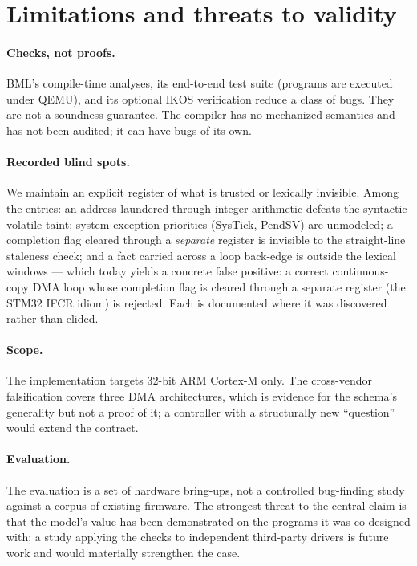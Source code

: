 \documentclass[10pt,twocolumn]{article}
\begin{document}
\section{Limitations and threats to validity}
\label{sec:limits}

\paragraph{Checks, not proofs.} BML's compile-time analyses, its end-to-end test
suite (programs are executed under QEMU), and its optional IKOS verification
reduce a class of bugs. They are not a soundness guarantee. The compiler has no
mechanized semantics and has not been audited; it can have bugs of its own.

\paragraph{Recorded blind spots.} We maintain an explicit register of what is
trusted or lexically invisible. Among the entries: an address laundered through
integer arithmetic defeats the syntactic volatile taint; system-exception
priorities (SysTick, PendSV) are unmodeled; a completion flag cleared through a
\emph{separate} register is invisible to the straight-line staleness check; and a
fact carried across a loop back-edge is outside the lexical windows --- which
today yields a concrete false positive: a correct continuous-copy DMA loop whose
completion flag is cleared through a separate register (the STM32 IFCR idiom) is
rejected. Each is documented where it was discovered rather than elided.

\paragraph{Scope.} The implementation targets 32-bit ARM Cortex-M only. The
cross-vendor falsification covers three DMA architectures, which is evidence for
the schema's generality but not a proof of it; a controller with a structurally
new ``question'' would extend the contract.

\paragraph{Evaluation.} The evaluation is a set of hardware bring-ups, not a
controlled bug-finding study against a corpus of existing firmware. The strongest
threat to the central claim is that the model's value has been demonstrated on
the programs it was co-designed with; a study applying the checks to independent
third-party drivers is future work and would materially strengthen the case.
\end{document}
